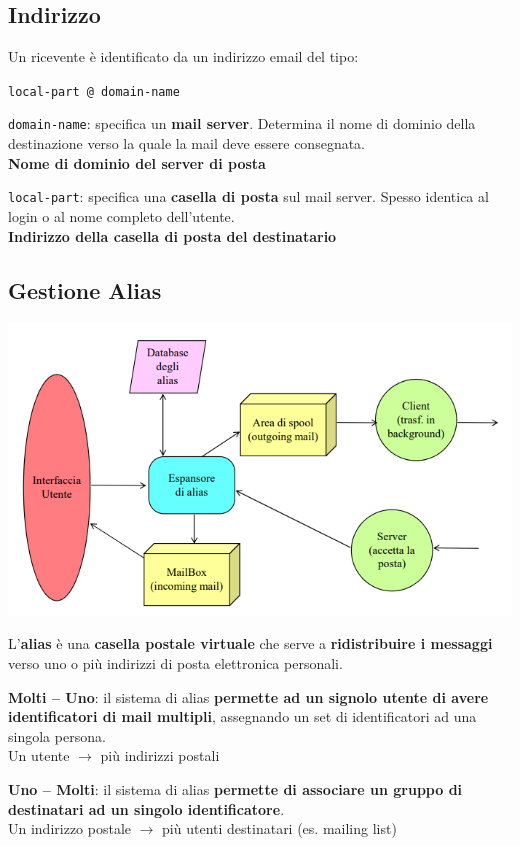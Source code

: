 \documentclass[10pt]{article}
\begin{document}
\subsection{Indirizzo}
Un ricevente è identificato da un indirizzo email del tipo:
\begin{center}
\texttt{local-part @ domain-name}
\end{center}
\begin{list}{}{}
\item \texttt{domain-name}: specifica un \textbf{mail server}. Determina il nome di dominio della destinazione verso la quale la mail deve essere consegnata.\\\textbf{Nome di dominio del server di posta}
\item \texttt{local-part}: specifica una \textbf{casella di posta} sul mail server. Spesso identica al login o al nome completo dell'utente.\\\textbf{Indirizzo della casella di posta del destinatario}
\end{list}
\pagebreak
\subsection{Gestione Alias}
\begin{center}
\includegraphics[scale=0.7]{smtpgestalias.png}
\end{center}
L'\textbf{alias} è una \textbf{casella postale virtuale} che serve a \textbf{ridistribuire i messaggi} verso uno o più indirizzi di posta elettronica personali.
\begin{list}{}{}
\item \textbf{Molti -- Uno}: il sistema di alias \textbf{permette ad un signolo utente di avere identificatori di mail multipli}, assegnando un set di identificatori ad una singola persona.\\
Un utente $\longrightarrow$ più indirizzi postali
\item \textbf{Uno -- Molti}: il sistema di alias \textbf{permette di associare un gruppo di destinatari ad un singolo identificatore}.\\
Un indirizzo postale $\longrightarrow$ più utenti destinatari (es. mailing list)
\end{list}
\end{document}
